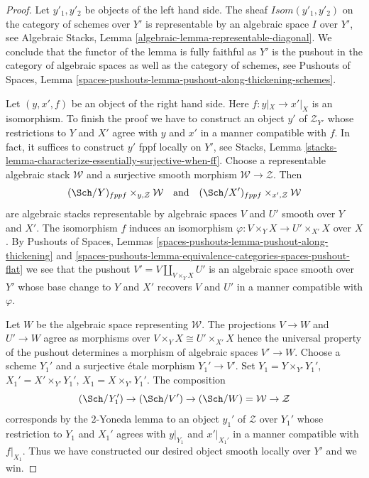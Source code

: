 \begin{proof}
Let $y'_1, y'_2$ be objects of the left hand side. The sheaf
$\mathit{Isom}(y'_1, y'_2)$ on the category of schemes over $Y'$
is representable by an algebraic space $I$ over $Y'$, see
Algebraic Stacks, Lemma \ref{algebraic-lemma-representable-diagonal}.
We conclude that the functor of the lemma is fully faithful as
$Y'$ is the pushout in the category of algebraic spaces as
well as the category of schemes, see
Pushouts of Spaces, Lemma
\ref{spaces-pushouts-lemma-pushout-along-thickening-schemes}.

\medskip\noindent
Let $(y, x', f)$ be an object of the right hand side. Here $f : y|_X \to x'|_X$
is an isomorphism. To finish the proof we have to construct an object $y'$ of
$\mathcal{Z}_{Y'}$ whose restrictions to $Y$ and $X'$ agree with $y$ and $x'$
in a manner compatible with $f$. In fact, it suffices to construct $y'$
fppf locally on $Y'$, see
Stacks, Lemma \ref{stacks-lemma-characterize-essentially-surjective-when-ff}.
Choose a representable algebraic stack
$\mathcal{W}$ and a surjective smooth morphism $\mathcal{W} \to \mathcal{Z}$.
Then
$$
(\Sch/Y)_{fppf} \times_{y, \mathcal{Z}} \mathcal{W}
\quad\text{and}\quad
(\Sch/X')_{fppf} \times_{x', \mathcal{Z}} \mathcal{W}
$$
are algebraic stacks representable by algebraic spaces $V$ and $U'$
smooth over $Y$ and $X'$. The isomorphism $f$ induces an isomorphism
$\varphi : V \times_Y X \to U' \times_{X'} X$ over $X$. By
Pushouts of Spaces, Lemmas
\ref{spaces-pushouts-lemma-pushout-along-thickening} and
\ref{spaces-pushouts-lemma-equivalence-categories-spaces-pushout-flat}
we see that the pushout $V' = V \amalg_{V \times_Y X} U'$ is
an algebraic space smooth over $Y'$ whose base change to
$Y$ and $X'$ recovers $V$ and $U'$ in a manner compatible with $\varphi$.

\medskip\noindent
Let $W$ be the algebraic space representing $\mathcal{W}$.
The projections $V \to W$ and $U' \to W$ agree as morphisms
over $V \times_Y X \cong U' \times_{X'} X$ hence the universal
property of the pushout determines a morphism of algebraic spaces
$V' \to W$. Choose a scheme $Y_1'$ and a surjective \'etale morphism
$Y_1' \to V'$. Set $Y_1 = Y \times_{Y'} Y_1'$,
$X_1' = X' \times_{Y'} Y_1'$, $X_1 = X \times_{Y'} Y_1'$.
The composition
$$
(\Sch/Y_1') \to (\Sch/V') \to (\Sch/W) = \mathcal{W} \to \mathcal{Z}
$$
corresponds by the $2$-Yoneda lemma to an object $y_1'$ of $\mathcal{Z}$
over $Y_1'$ whose restriction to $Y_1$ and $X_1'$ agrees with $y|_{Y_1}$
and $x'|_{X_1'}$ in a manner compatible with $f|_{X_1}$. Thus we have
constructed our desired object smooth locally over $Y'$ and we win.
\end{proof}








